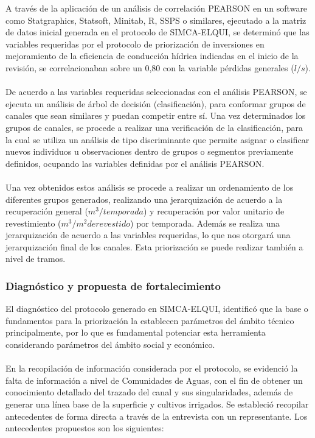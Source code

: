 \documentclass[]{article}
\begin{document}
A través de la aplicación de un análisis de correlación PEARSON en un software como Statgraphics, Statsoft, Minitab, R, SSPS o similares, ejecutado a la matriz de datos inicial generada en el protocolo de SIMCA-ELQUI, se determinó que las variables requeridas por el protocolo de priorización de inversiones en mejoramiento de la eficiencia de conducción hídrica indicadas en el inicio de la revisión, se correlacionaban sobre un 0,80 con la variable pérdidas generales ($l/s$).\\
\\
De acuerdo a las variables requeridas seleccionadas con el análisis PEARSON, se ejecuta un análisis de árbol de decisión (clasificación), para conformar grupos de canales que sean similares y puedan competir entre sí. Una vez determinados los grupos de canales, se procede a realizar una verificación de la clasificación, para la cual se utiliza un análisis de tipo discriminante que permite asignar o clasificar nuevos individuos u observaciones dentro de grupos o segmentos previamente definidos, ocupando las variables definidas por el análisis PEARSON.\\
\\
Una vez obtenidos estos análisis se procede a realizar un ordenamiento de los diferentes grupos generados, realizando una jerarquización de acuerdo a la recuperación general ($m^3/temporada$) y recuperación por valor unitario de revestimiento ($m^3/m^2 de revestido$) por temporada. Además se realiza una jerarquización de acuerdo a las variables requeridas, lo que nos otorgará una jerarquización final de los canales. Esta priorización se puede realizar también a nivel de tramos.

\subsubsection{Diagnóstico y propuesta de fortalecimiento}

El diagnóstico del protocolo generado en SIMCA-ELQUI, identificó que la base o fundamentos para la priorización la establecen parámetros del ámbito técnico principalmente, por lo que es fundamental potenciar esta herramienta considerando parámetros del ámbito social y económico.\\
\\
En la recopilación de información considerada por el protocolo, se evidenció la falta de información a nivel de Comunidades de Aguas, con el fin de obtener un conocimiento detallado del trazado del canal y sus singularidades, además de generar una línea base de la superficie y cultivos irrigados. Se estableció recopilar antecedentes de forma directa a través de la entrevista con un representante. Los antecedentes propuestos son los siguientes:
\end{document}
